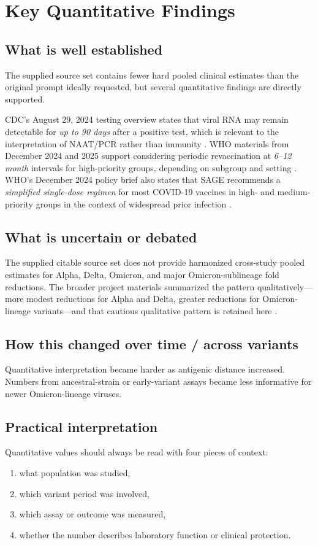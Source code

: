 \documentclass[12pt]{article}
\begin{document}
\section{Key Quantitative Findings}
\subsection*{What is well established}
The supplied source set contains fewer hard pooled clinical estimates than the original prompt ideally requested, but several quantitative findings are directly supported.

CDC's August 29, 2024 testing overview states that viral RNA may remain detectable for \emph{up to 90 days} after a positive test, which is relevant to the interpretation of NAAT/PCR rather than immunity \cite{ref1}. WHO materials from December 2024 and 2025 support considering periodic revaccination at \emph{6--12 month} intervals for high-priority groups, depending on subgroup and setting \cite{ref9,ref10,ref11,ref12}. WHO's December 2024 policy brief also states that SAGE recommends a \emph{simplified single-dose regimen} for most COVID-19 vaccines in high- and medium-priority groups in the context of widespread prior infection \cite{ref9,ref10}.

\subsection*{What is uncertain or debated}
The supplied citable source set does not provide harmonized cross-study pooled estimates for Alpha, Delta, Omicron, and major Omicron-sublineage fold reductions. The broader project materials summarized the pattern qualitatively---more modest reductions for Alpha and Delta, greater reductions for Omicron-lineage variants---and that cautious qualitative pattern is retained here \cite{ref3,ref5}.

\subsection*{How this changed over time / across variants}
Quantitative interpretation became harder as antigenic distance increased. Numbers from ancestral-strain or early-variant assays became less informative for newer Omicron-lineage viruses.

\subsection*{Practical interpretation}
Quantitative values should always be read with four pieces of context:
\begin{enumerate}[leftmargin=1.5em]
    \item what population was studied,
    \item which variant period was involved,
    \item which assay or outcome was measured,
    \item whether the number describes laboratory function or clinical protection.
\end{enumerate}
\end{document}
